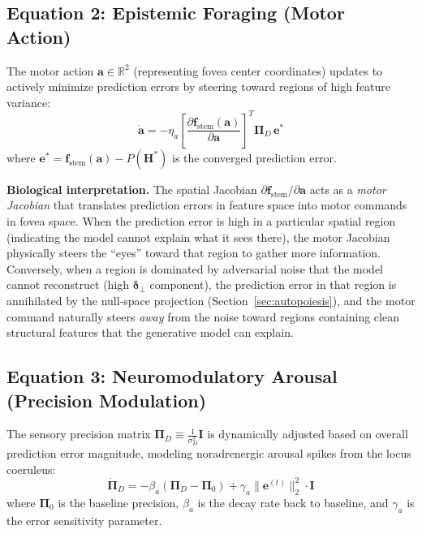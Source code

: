 \documentclass[12pt,a4paper]{article}
\begin{document}
\subsection{Equation 2: Epistemic Foraging (Motor Action)}

The motor action $\mathbf{a} \in \mathbb{R}^2$ (representing fovea center
coordinates) updates to actively minimize prediction errors by steering
toward regions of high feature variance:
\begin{equation}
  \dot{\mathbf{a}} = -\eta_a
  \left[ \frac{\partial \mathbf{f}_{\mathrm{stem}}(\mathbf{a})}
  {\partial \mathbf{a}} \right]^T
  \bm{\Pi}_D \, \mathbf{e}^*
  \label{eq:epistemic_foraging}
\end{equation}
where $\mathbf{e}^* = \mathbf{f}_{\mathrm{stem}}(\mathbf{a}) - P(\mathbf{H}^*)$
is the converged prediction error.

\textbf{Biological interpretation.} The spatial Jacobian
$\partial \mathbf{f}_{\mathrm{stem}} / \partial \mathbf{a}$ acts as a
\textit{motor Jacobian} that translates prediction errors in feature space
into motor commands in fovea space. When the prediction error is high in a
particular spatial region (indicating the model cannot explain what it sees
there), the motor Jacobian physically steers the ``eyes'' toward that region
to gather more information. Conversely, when a region is dominated by
adversarial noise that the model cannot reconstruct (high
$\bm{\delta}_\perp$ component), the prediction error in that region is
annihilated by the null-space projection (Section~\ref{sec:autopoiesis}),
and the motor command naturally steers \textit{away} from the noise toward
regions containing clean structural features that the generative model can
explain.

\subsection{Equation 3: Neuromodulatory Arousal (Precision Modulation)}

The sensory precision matrix
$\bm{\Pi}_D \equiv \frac{1}{\sigma_D^2} \mathbf{I}$ is dynamically
adjusted based on overall prediction error magnitude, modeling
noradrenergic arousal spikes from the locus coeruleus:
\begin{equation}
  \dot{\bm{\Pi}}_D = -\beta_a (\bm{\Pi}_D - \bm{\Pi}_0)
  + \gamma_a \|\mathbf{e}^{(t)}\|_2^2 \cdot \mathbf{I}
  \label{eq:arousal}
\end{equation}
where $\bm{\Pi}_0$ is the baseline precision, $\beta_a$ is the decay rate
back to baseline, and $\gamma_a$ is the error sensitivity parameter.
\end{document}
